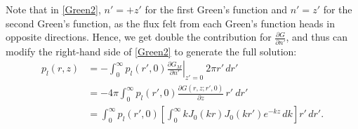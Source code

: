 \documentclass[11pt,a4paper]{article}
\begin{document}
	Note that in \eqref{Green2}, $n' = +z'$ for the first Green's function and $n' = z'$ for the second Green's function, as the flux felt from each Green's function heads in opposite directions. Hence, we get double the contribution for $\frac{\partial G}{\partial n'}$, and thus can modify the right-hand side of \eqref{Green2} to generate the full solution:
	\begin{equation}
		\label{PressureGreen}
		\begin{aligned}
			p_l(r, z) &= -\int_0^\infty p_l(r', 0) \left.\frac{\partial G_M}{\partial n'}\right|_{z'=0}\ 2\pi r' \, dr' \\
			&= -4\pi \int_0^\infty p_l(r', 0) \frac{\partial G(r,z;r',0)}{\partial z} \, r'\ dr' \\
			&= \int_0^\infty p_l(r', 0) \left[\int_0^\infty k J_0(k r) J_0(k r') e^{-k z} \, dk\right] r' \, dr'.
		\end{aligned}
	\end{equation}
	
\end{document}
